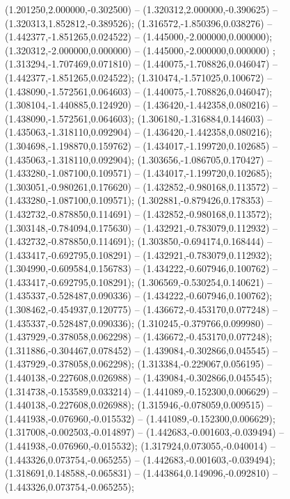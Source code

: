  (1.201250,2.000000,-0.302500) -- (1.320312,2.000000,-0.390625) -- (1.320313,1.852812,-0.389526);
 (1.316572,-1.850396,0.038276) -- (1.442377,-1.851265,0.024522) -- (1.445000,-2.000000,0.000000);
 (1.320312,-2.000000,0.000000) -- (1.445000,-2.000000,0.000000) ;
 (1.313294,-1.707469,0.071810) -- (1.440075,-1.708826,0.046047) -- (1.442377,-1.851265,0.024522);
 (1.310474,-1.571025,0.100672) -- (1.438090,-1.572561,0.064603) -- (1.440075,-1.708826,0.046047);
 (1.308104,-1.440885,0.124920) -- (1.436420,-1.442358,0.080216) -- (1.438090,-1.572561,0.064603);
 (1.306180,-1.316884,0.144603) -- (1.435063,-1.318110,0.092904) -- (1.436420,-1.442358,0.080216);
 (1.304698,-1.198870,0.159762) -- (1.434017,-1.199720,0.102685) -- (1.435063,-1.318110,0.092904);
 (1.303656,-1.086705,0.170427) -- (1.433280,-1.087100,0.109571) -- (1.434017,-1.199720,0.102685);
 (1.303051,-0.980261,0.176620) -- (1.432852,-0.980168,0.113572) -- (1.433280,-1.087100,0.109571);
 (1.302881,-0.879426,0.178353) -- (1.432732,-0.878850,0.114691) -- (1.432852,-0.980168,0.113572);
 (1.303148,-0.784094,0.175630) -- (1.432921,-0.783079,0.112932) -- (1.432732,-0.878850,0.114691);
 (1.303850,-0.694174,0.168444) -- (1.433417,-0.692795,0.108291) -- (1.432921,-0.783079,0.112932);
 (1.304990,-0.609584,0.156783) -- (1.434222,-0.607946,0.100762) -- (1.433417,-0.692795,0.108291);
 (1.306569,-0.530254,0.140621) -- (1.435337,-0.528487,0.090336) -- (1.434222,-0.607946,0.100762);
 (1.308462,-0.454937,0.120775) -- (1.436672,-0.453170,0.077248) -- (1.435337,-0.528487,0.090336);
 (1.310245,-0.379766,0.099980) -- (1.437929,-0.378058,0.062298) -- (1.436672,-0.453170,0.077248);
 (1.311886,-0.304467,0.078452) -- (1.439084,-0.302866,0.045545) -- (1.437929,-0.378058,0.062298);
 (1.313384,-0.229067,0.056195) -- (1.440138,-0.227608,0.026988) -- (1.439084,-0.302866,0.045545);
 (1.314738,-0.153589,0.033214) -- (1.441089,-0.152300,0.006629) -- (1.440138,-0.227608,0.026988);
 (1.315946,-0.078059,0.009515) -- (1.441938,-0.076960,-0.015532) -- (1.441089,-0.152300,0.006629);
 (1.317008,-0.002503,-0.014897) -- (1.442683,-0.001603,-0.039494) -- (1.441938,-0.076960,-0.015532);
 (1.317924,0.073055,-0.040014) -- (1.443326,0.073754,-0.065255) -- (1.442683,-0.001603,-0.039494);
 (1.318691,0.148588,-0.065831) -- (1.443864,0.149096,-0.092810) -- (1.443326,0.073754,-0.065255);
